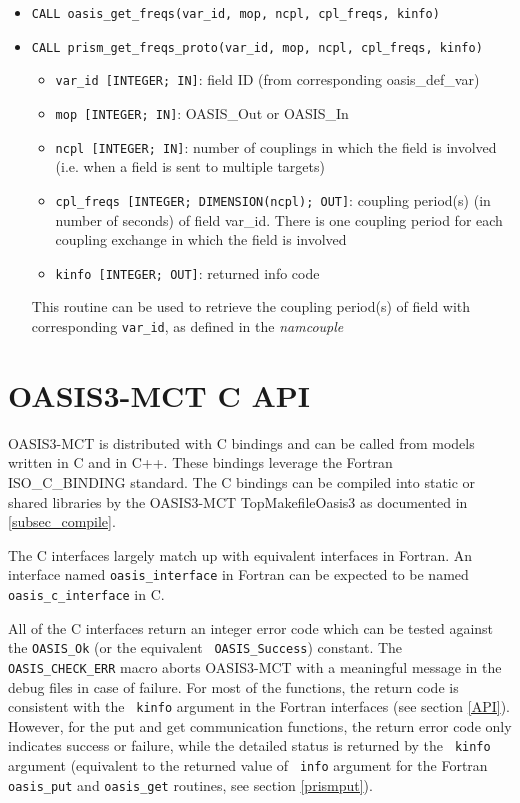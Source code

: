 \begin{itemize}
This routine returns the number of coupling exchanges in which the
field with that {\tt var\_id} is
involved. This number is needed to get the coupling frequencies with the
routine oasis\_get\_freqs, see below.

\item {\tt CALL oasis\_get\_freqs(var\_id, mop, ncpl, cpl\_freqs, kinfo)}
\item {\tt CALL prism\_get\_freqs\_proto(var\_id, mop, ncpl, cpl\_freqs, kinfo)}
  \begin{itemize}
  \item {\tt var\_id [INTEGER; IN]}: field ID (from
  corresponding oasis\_def\_var)
  \item {\tt mop [INTEGER; IN]}: OASIS\_Out or OASIS\_In 
  \item {\tt ncpl [INTEGER; IN]}: number of couplings in which the field
  is involved (i.e. when a field is sent to multiple targets)
   \item {\tt cpl\_freqs [INTEGER; DIMENSION(ncpl); OUT]}: coupling period(s) 
  (in number of seconds) of field var\_id. There is one coupling period for
  each coupling exchange in which the field is involved
  \item {\tt kinfo [INTEGER; OUT]}: returned info code
  \end{itemize}

This routine can be used to retrieve the coupling period(s) of field with
corresponding {\tt var\_id}, as defined in the {\it namcouple}

\end{itemize}

\section{OASIS3-MCT C API}
\label{APIC} 

OASIS3-MCT is distributed with C bindings and can be called from models written
in C and in C++.  These bindings leverage the Fortran ISO\_C\_BINDING standard.  
The C bindings can be compiled into static or shared libraries by the
OASIS3-MCT TopMakefileOasis3 as documented in \ref{subsec_compile}.

The C interfaces largely match
up with equivalent interfaces in Fortran.  An interface named
{\tt oasis\_interface} in Fortran can be expected to be named
{\tt oasis\_c\_interface} in C.

All of the C interfaces return an integer error code which can be
tested against the {\tt OASIS\_Ok} (or the equivalent {\tt
  OASIS\_Success}) constant.
The {\tt OASIS\_CHECK\_ERR} macro aborts
OASIS3-MCT with a meaningful message in the debug files in case of failure.
For most of the functions,
the return code is consistent with the {\tt
  kinfo} argument in the Fortran interfaces (see section \ref{API}). However, for the put and get communication functions, the return error code only indicates
success or failure, while the detailed status is returned by the {\tt
  kinfo} argument (equivalent to the returned value of {\tt
  info} argument for the Fortran {\tt oasis\_put} and {\tt oasis\_get} routines, see section \ref{prismput}).
 
